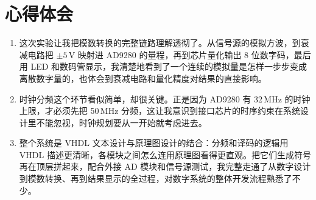 \documentclass{ctexrep}
\begin{document}
\section{心得体会}

\begin{enumerate}
    \item 这次实验让我把模数转换的完整链路理解透彻了。从信号源的模拟方波，到衰减电路把 $\pm5\,$V 映射进 AD9280 的量程，再到芯片量化输出 8 位数字码，最后用 LED 和数码管显示，我清楚地看到了一个连续的模拟量是怎样一步步变成离散数字量的，也体会到衰减电路和量化精度对结果的直接影响。
    \item 时钟分频这个环节看似简单，却很关键。正是因为 AD9280 有 32\,MHz 的时钟上限，才必须先把 50\,MHz 分频，这让我意识到接口芯片的时序约束在系统设计里不能忽视，时钟规划要从一开始就考虑进去。
    \item 整个系统是 VHDL 文本设计与原理图设计的结合：分频和译码的逻辑用 VHDL 描述更清晰，各模块之间怎么连用原理图看得更直观。把它们生成符号再在顶层拼起来，配合外接 AD 模块和信号源测试，我完整走通了从数字设计到模数转换、再到结果显示的全过程，对数字系统的整体开发流程熟悉了不少。
\end{enumerate}
\end{document}
